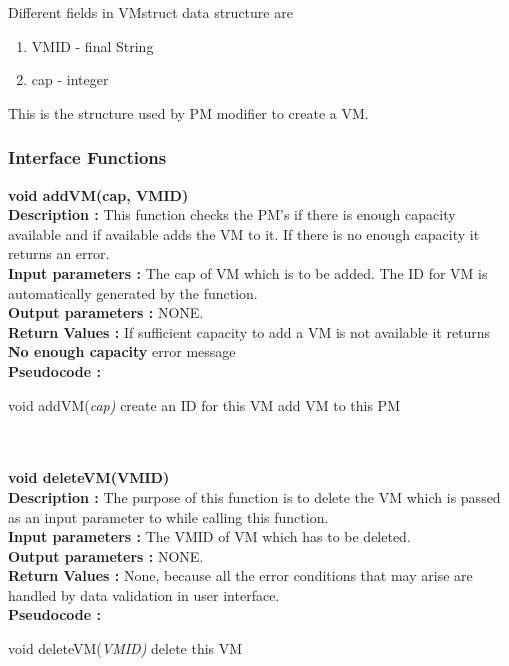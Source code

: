 \documentclass[a4paper,11pt]{article}
\begin{document}
Different fields in VMstruct data structure are
\begin{enumerate}
 \item VM\textunderscore ID - final String
 \item cap - integer
\end{enumerate}
This is the structure used by PM modifier to create a VM.
\subsubsection{Interface Functions}
\textbf{void addVM(cap, VM\textunderscore ID)}
\\
\textbf{Description :} This function checks the PM's if there is enough capacity available and if available adds the VM to it. If there is no enough capacity 
it returns an error.
\\
\textbf{Input parameters :} The cap of VM which is to be added. The ID for VM is automatically generated by the function.
\\
\textbf{Output parameters :} NONE.
\\
\textbf{Return Values :} If sufficient capacity to add a VM is not available it returns \textbf{No enough capacity} error message
\\
\textbf{Pseudocode :}
\begin{algorithmic}[1]
\STATE void addVM(\emph{cap)}
\STATE create an ID for this VM
\STATE add VM to this PM
\ENDIF
\ENDFOR
\end{algorithmic}
\mbox{}\\\\
\textbf{void deleteVM(VM\textunderscore ID)}
\\
\textbf{Description :} The purpose of this function is to delete the VM which is passed as an input parameter to while calling this function.
\\
\textbf{Input parameters :} The VM\textunderscore ID of VM which has to be deleted.
\\
\textbf{Output parameters :} NONE.
\\
\textbf{Return Values :} None, because all the error conditions that may arise are handled by data validation in user interface.
\\
\textbf{Pseudocode :}
\begin{algorithmic}[1]
\STATE void deleteVM(\emph{VM\textunderscore ID)}
\STATE delete this VM
\ENDIF
\ENDFOR
\ENDFOR
\end{algorithmic}
\end{document}
